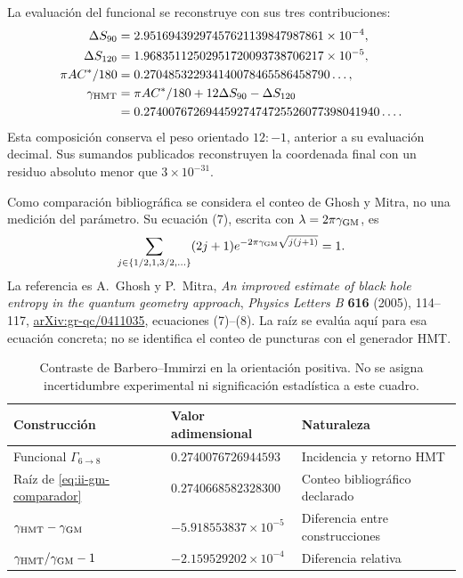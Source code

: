 La evaluación del funcional se reconstruye con sus tres contribuciones:
\begin{align*}
 \Delta S_{90}&=2.95169439297457621139847987861\times10^{-4},\\
 \Delta S_{120}&=1.96835112502951720093738706217\times10^{-5},\\
 \pi AC^*/180&=0.270485322934140078465586458790\ldots,\\
 \gamma_{\rm HMT}&=\pi AC^*/180+12\Delta S_{90}-\Delta S_{120}\\
 &=0.27400767269445927474725526077398041940\ldots.
\end{align*}
Esta composición conserva el peso orientado \(12:-1\), anterior a su
evaluación decimal. Sus sumandos publicados reconstruyen la coordenada
final con un residuo absoluto menor que \(3\times10^{-31}\).

Como comparación bibliográfica se considera el conteo de Ghosh y Mitra,
no una medición del parámetro. Su ecuación (7), escrita con
\(\lambda=2\pi\gamma_{\rm GM}\), es
\begin{equation}
 \sum_{j\in\{1/2,1,3/2,\ldots\}}(2j+1)
 e^{-2\pi\gamma_{\rm GM}\sqrt{j(j+1)}}=1.
 \label{eq:ii-gm-comparador}
\end{equation}
La referencia es A.~Ghosh y P.~Mitra,
\emph{An improved estimate of black hole entropy in the quantum geometry
approach}, \emph{Physics Letters B} \textbf{616} (2005), 114--117,
\href{https://arxiv.org/abs/gr-qc/0411035}{arXiv:gr-qc/0411035},
ecuaciones (7)--(8). La raíz se evalúa aquí para esa ecuación concreta;
no se identifica el conteo de puncturas con el generador HMT.

\begin{table}[htbp]
\centering\small
\begin{tabular}{@{}lll@{}}
\toprule
Construcción & Valor adimensional & Naturaleza\\
\midrule
Funcional \(\Gamma_{6\to8}\) & \(0.2740076726944593\) & Incidencia y retorno HMT\\
Raíz de \eqref{eq:ii-gm-comparador} & \(0.2740668582328300\) & Conteo bibliográfico declarado\\
\midrule
\(\gamma_{\rm HMT}-\gamma_{\rm GM}\) & \(-5.918553837\times10^{-5}\) & Diferencia entre construcciones\\
\(\gamma_{\rm HMT}/\gamma_{\rm GM}-1\) & \(-2.159529202\times10^{-4}\) & Diferencia relativa\\
\bottomrule
\end{tabular}
\caption{Contraste de Barbero--Immirzi en la orientación positiva. No se
asigna incertidumbre experimental ni significación estadística a este cuadro.}
\label{tab:ii-barbero-comparacion}
\end{table}

